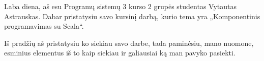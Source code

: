 \begin{comment}
  \begin{enumerate}
    \item Tematika (svarbiausių tematikos sąvokų apibrėžimai,
      įvadas į tematiką) - 1 skaidrė
    \item Problemos/uždavinio formulavimas (iš to turi išplaukti
      pagrindinė darbo tema) - 1 skaidrė
    \item Darbo tikslo formulavimas (jei sutampa su problemos
      formulavimu, tai kartoti nereikia) - 1 skaidrė
    \item Darbo planas (kaip pasieksite tikslą) - čia surašote
      punktus, kuriais buvo/bus pasiektas darbo tikslas - 1 skaidrė
    \item Temos gynimui (magistrantams): svarbiausios sąvokos
      (apibrėžimai, jei ilgi, neturi būti rašomi - turi būti sakomi
      žodžiu) - 2-3 skaidrės
    \item Darbo gynimui (bakalaurams, magistrantams): darbo metu
      iškilusios problemos, esminiai priimti sprendimai, kas buvo
      padaryta jūsų pačių ("susipažinau", "sukonspektavau",
      "išsiaiškinau", "išmokau" tinka tik kursiniams darbams!) - 3-6
      skaidrės
    \item (Laukiami) rezultatai - sąrašo pavidalu, ne daugiau trijų.
      "Susipažinau", "sukonspektavau", "išsiaiškinau", "išmokau" tinka
      tik kursiniams darbams! - 1 skaidrė
    \item Išvados - sąrašo pavidalu, ne daugiau trijų (temos gynime
      nereikia) - 1 skaidrė. Nebandykite rezultatų, pastebėjimų,
      komentarų, nuomonių apiforminti kaip išvadų!
  \end{enumerate}

  Pristatymo tikslas: supažindinti komisiją su darbu.
  1.  Darbo tikslas ir uždaviniai – planas.
  2.  Kas buvo padaryta – realizacija.
  3.  Rezultatai ir išvados.

  1.  Ko siekta.
  2.  Kaip siekta.
  3.  Kas pasiekta.
\end{comment}

\begin{handout}
  Laba diena, aš esu Programų sistemų 3 kurso 2 grupės studentas
  Vytautas Astrauskas. Dabar pristatysiu savo kursinį darbą, kurio
  tema yra „Komponentinis programavimas su Scala“.
\end{handout}

\begin{handout}
  Iš pradžių aš pristatysiu ko siekiau savo darbe, tada paminėsiu,
  mano nuomone, esminius elementus iš to kaip siekiau ir galiausiai
  ką man pavyko pasiekti.
\end{handout}

